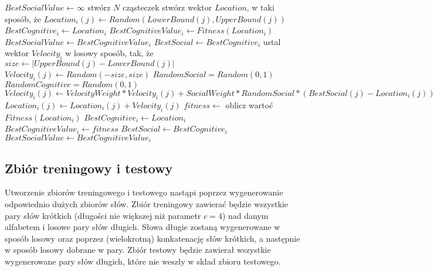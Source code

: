 \documentclass{../llncs_template_final/llncs}
\begin{document}
\begin{algorithm}
\begin{algorithmic}[1]
    \State $BestSocialValue \gets \infty$
    \State stwórz $N$ cząsteczek
        \State stwórz wektor $Location$, w taki sposób, że
            \State $Location_i(j) \gets Random(LowerBound(j), UpperBound(j))$
        \EndFor
        \State $BestCognitive_i \gets Location_i$
        \State $BestCognitiveValue_i \gets Fitness(Location_i)$
            \State $BestSocialValue \gets BestCognitiveValue_i$
            \State $BestSocial  \gets BestCognitive_i$
        \EndIf
        \State ustal wektor $Velocity_i$ w losowy sposób, tak, że
            \State $size \gets |UpperBound(j) - LowerBound(j)|$
            \State $Velocity_i(j) \gets Random(-size, size)$
        \EndFor
    \EndFor
                \State $RandomSocial = Random(0, 1)$
                \State $RandomCognitive = Random(0, 1)$
                \State $Velocity_i(j) \gets VelocityWeight * Velocity_i(j) + SocialWeight * RandomSocial * (BestSocial(j) - Location_i(j)) + CognitiveWeight * RandomCognitive * (BestCognitive_i(j) - Location_i(j))$
                \State $Location_i(j) \gets Location_i(j) + Velocity_i(j)$
            \EndFor
            \State $fitness \gets$ oblicz wartoć $Fitness(Location_i)$
                \State $BestCognitive_i \gets Location_i$
                \State $BestCognitiveValue_i \gets fitness$
                    \State $BestSocial \gets BestCognitive_i$
                    \State $BestSocialValue \gets BestCognitiveValue_i$
                \EndIf
            \EndIf
        \EndFor
    \EndFor
    \State {}
\EndProcedure
\end{algorithmic}
\caption{PSO}\label{alg:pso}
\end{algorithm}

\subsection{Zbiór treningowy i testowy}

Utworzenie zbiorów treningowego i testowego nastąpi poprzez wygenerowanie odpowiednio dużych zbiorów słów. Zbiór treningowy zawierać będzie wszystkie pary słów krótkich (długości nie większej niż parametr $c = 4$) nad danym alfabetem i losowe pary słów długich. Słowa długie zostaną wygenerowane w sposób losowy oraz poprzez (wielokrotną) konkatenację słów krótkich, a następnie w sposób losowy dobrane w pary. Zbiór testowy będzie zawierał wszystkie wygenerowane pary słów długich, które nie weszły w skład zbioru testowego. 
\end{document}
